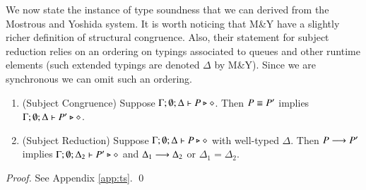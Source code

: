 We now state the instance of type soundness that we can derived from the Mostrous and Yoshida system.
It is worth noticing that M\&Y have a slightly richer definition of structural congruence.
Also, their statement for subject reduction relies on an ordering on typings associated to queues and other 
runtime elements (such extended typings are denoted $\Delta$ by M\&Y).
Since we are synchronous we can omit such an ordering.

\begin{theorem}\label{t:sr}\rm
	\begin{enumerate}[1.]
		\item	(Subject Congruence) Suppose $\Gamma; \emptyset; \Delta \vdash P \triangleright \diamond$.
			Then $P \equiv P'$ implies $\Gamma; \emptyset; \Delta \vdash P' \triangleright \diamond$.

		\item	(Subject Reduction) Suppose $\Gamma; \emptyset; \Delta \vdash P \triangleright \diamond$
			with
			well-typed $\Delta$.
			Then $P \longrightarrow P'$ implies $\Gamma; \emptyset; \Delta_2  \vdash P' \triangleright \diamond$
			and $\Delta_1 \longrightarrow \Delta_2$ or $\Delta_1 = \Delta_2$.
	\end{enumerate}
\end{theorem}

\begin{proof}
	See Appendix \ref{app:ts}.
	\qed
\end{proof}
